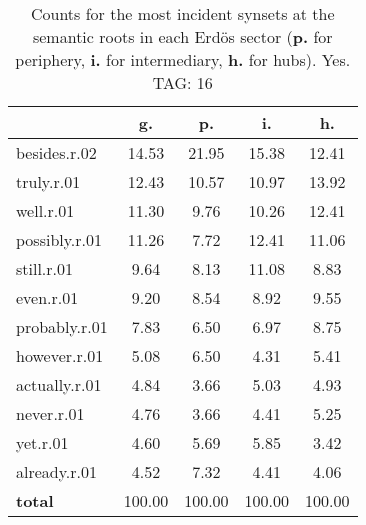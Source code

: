 \begin{table}[h!]
\begin{center}
\begin{tabular}{| l || c | c | c | c |}\hline
 & {\bf g.} & {\bf p.} & {\bf i.} & {\bf h.} \\\hline\hline
besides.r.02 & 14.53  & 21.95  & 15.38  & 12.41 \\\hline
truly.r.01 & 12.43  & 10.57  & 10.97  & 13.92 \\\hline
well.r.01 & 11.30  & 9.76  & 10.26  & 12.41 \\\hline
possibly.r.01 & 11.26  & 7.72  & 12.41  & 11.06 \\\hline
still.r.01 & 9.64  & 8.13  & 11.08  & 8.83 \\\hline
even.r.01 & 9.20  & 8.54  & 8.92  & 9.55 \\\hline
probably.r.01 & 7.83  & 6.50  & 6.97  & 8.75 \\\hline
however.r.01 & 5.08  & 6.50  & 4.31  & 5.41 \\\hline
actually.r.01 & 4.84  & 3.66  & 5.03  & 4.93 \\\hline
never.r.01 & 4.76  & 3.66  & 4.41  & 5.25 \\\hline
yet.r.01 & 4.60  & 5.69  & 5.85  & 3.42 \\\hline
already.r.01 & 4.52  & 7.32  & 4.41  & 4.06 \\\hline\hline
{{\bf total}} & 100.00  & 100.00  & 100.00  & 100.00 \\\hline
\end{tabular}
\caption{Counts for the most incident synsets at the semantic roots in each Erd\"os sector ({\bf p.} for periphery, {\bf i.} for intermediary, {\bf h.} for hubs). Yes. TAG: 16}
\end{center}
\end{table}